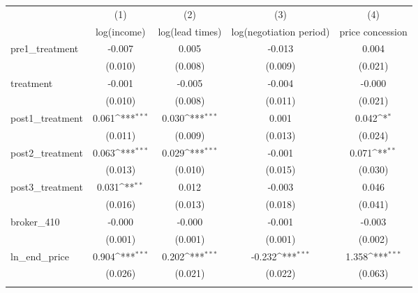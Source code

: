 {
\def\sym#1{\ifmmode^{#1}\else\(^{#1}\)\fi}
\begin{tabular}{l*{4}{c}}
\toprule
            &\multicolumn{1}{c}{(1)}&\multicolumn{1}{c}{(2)}&\multicolumn{1}{c}{(3)}&\multicolumn{1}{c}{(4)}\\
            &\multicolumn{1}{c}{log(income)}&\multicolumn{1}{c}{log(lead times)}&\multicolumn{1}{c}{log(negotiation period)}&\multicolumn{1}{c}{price concession}\\
\midrule
pre1\_treatment&      -0.007         &       0.005         &      -0.013         &       0.004         \\
            &     (0.010)         &     (0.008)         &     (0.009)         &     (0.021)         \\
\addlinespace
treatment   &      -0.001         &      -0.005         &      -0.004         &      -0.000         \\
            &     (0.010)         &     (0.008)         &     (0.011)         &     (0.021)         \\
\addlinespace
post1\_treatment&       0.061\sym{***}&       0.030\sym{***}&       0.001         &       0.042\sym{*}  \\
            &     (0.011)         &     (0.009)         &     (0.013)         &     (0.024)         \\
\addlinespace
post2\_treatment&       0.063\sym{***}&       0.029\sym{***}&      -0.001         &       0.071\sym{**} \\
            &     (0.013)         &     (0.010)         &     (0.015)         &     (0.030)         \\
\addlinespace
post3\_treatment&       0.031\sym{**} &       0.012         &      -0.003         &       0.046         \\
            &     (0.016)         &     (0.013)         &     (0.018)         &     (0.041)         \\
\addlinespace
broker\_410  &      -0.000         &      -0.000         &      -0.001         &      -0.003         \\
            &     (0.001)         &     (0.001)         &     (0.001)         &     (0.002)         \\
\addlinespace
ln\_end\_price&       0.904\sym{***}&       0.202\sym{***}&      -0.232\sym{***}&       1.358\sym{***}\\
            &     (0.026)         &     (0.021)         &     (0.022)         &     (0.063)         \\
\addlinespace

\end{tabular}}

